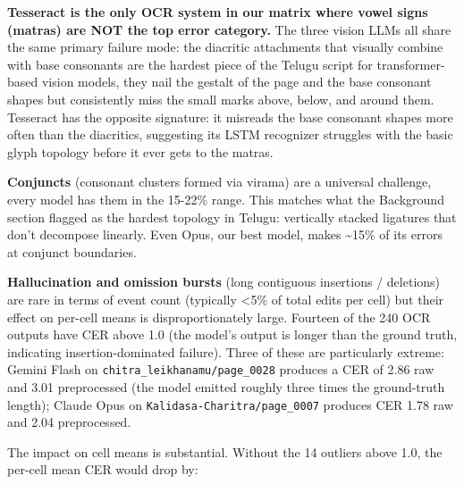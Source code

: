 \documentclass[
  letterpaper,
  DIV=11,
  numbers=noendperiod]{scrartcl}
\begin{document}
\textbf{Tesseract is the only OCR system in our matrix where vowel signs
(matras) are NOT the top error category.} The three vision LLMs all
share the same primary failure mode: the diacritic attachments that
visually combine with base consonants are the hardest piece of the
Telugu script for transformer-based vision models, they nail the gestalt
of the page and the base consonant shapes but consistently miss the
small marks above, below, and around them. Tesseract has the opposite
signature: it misreads the base consonant shapes more often than the
diacritics, suggesting its LSTM recognizer struggles with the basic
glyph topology before it ever gets to the matras.

\textbf{Conjuncts} (consonant clusters formed via virama) are a
universal challenge, every model has them in the 15-22\% range. This
matches what the Background section flagged as the hardest topology in
Telugu: vertically stacked ligatures that don't decompose linearly. Even
Opus, our best model, makes \textasciitilde15\% of its errors at
conjunct boundaries.

\textbf{Hallucination and omission bursts} (long contiguous insertions /
deletions) are rare in terms of event count (typically \textless5\% of
total edits per cell) but their effect on per-cell means is
disproportionately large. Fourteen of the 240 OCR outputs have CER above
1.0 (the model's output is longer than the ground truth, indicating
insertion-dominated failure). Three of these are particularly extreme:
Gemini Flash on \texttt{chitra\_leikhanamu/page\_0028} produces a CER of
2.86 raw and 3.01 preprocessed (the model emitted roughly three times
the ground-truth length); Claude Opus on
\texttt{Kalidasa-Charitra/page\_0007} produces CER 1.78 raw and 2.04
preprocessed.

The impact on cell means is substantial. Without the 14 outliers above
1.0, the per-cell mean CER would drop by:
\end{document}
